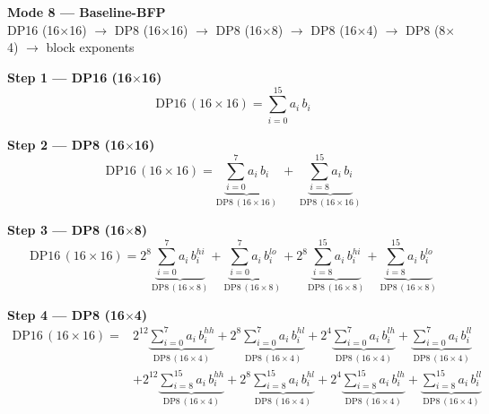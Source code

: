 \documentclass[fleqn]{article}
\newcommand{\DPop}[3]{\mathrm{DP#1}\,(#2\!\times\!#3)}
\begin{document}
\begin{center}
{\LARGE \textbf{Mode 8 --- Baseline-BFP}}\\[4pt]
{\large DP16 (16$\times$16) $\rightarrow$ DP8 (16$\times$16) $\rightarrow$ DP8 (16$\times$8) $\rightarrow$ DP8 (16$\times$4) $\rightarrow$ DP8 (8$\times$4) $\rightarrow$ block exponents}
\end{center}

\vspace{0.3em}

\textbf{Step 1 --- DP16 (16$\times$16)}
\[ \DPop{16}{16}{16} = \sum_{i=0}^{15} a_i \, b_i \]

\textbf{Step 2 --- DP8 (16$\times$16)}
\[
\DPop{16}{16}{16}
  = \underbrace{\sum_{i=0}^{7} a_i \, b_i}_{\DPop{8}{16}{16}}
  \; + \; \underbrace{\sum_{i=8}^{15} a_i \, b_i}_{\DPop{8}{16}{16}}
\]

\textbf{Step 3 --- DP8 (16$\times$8)}
\[
\DPop{16}{16}{16}
  = 2^{8} \underbrace{\sum_{i=0}^{7} a_i \, b_i^{hi}}_{\DPop{8}{16}{8}}
  + \underbrace{\sum_{i=0}^{7} a_i \, b_i^{lo}}_{\DPop{8}{16}{8}}
  + 2^{8} \underbrace{\sum_{i=8}^{15} a_i \, b_i^{hi}}_{\DPop{8}{16}{8}}
  + \underbrace{\sum_{i=8}^{15} a_i \, b_i^{lo}}_{\DPop{8}{16}{8}}
\]

\textbf{Step 4 --- DP8 (16$\times$4)}
\begin{align*}
\DPop{16}{16}{16} = {}
  & 2^{12} \underbrace{\sum_{i=0}^{7} a_i \, b_i^{hh}}_{\DPop{8}{16}{4}}
  + 2^{8} \underbrace{\sum_{i=0}^{7} a_i \, b_i^{hl}}_{\DPop{8}{16}{4}}
  + 2^{4} \underbrace{\sum_{i=0}^{7} a_i \, b_i^{lh}}_{\DPop{8}{16}{4}}
  + \underbrace{\sum_{i=0}^{7} a_i \, b_i^{ll}}_{\DPop{8}{16}{4}} \\[0.3em]
  & + 2^{12} \underbrace{\sum_{i=8}^{15} a_i \, b_i^{hh}}_{\DPop{8}{16}{4}}
  + 2^{8} \underbrace{\sum_{i=8}^{15} a_i \, b_i^{hl}}_{\DPop{8}{16}{4}}
  + 2^{4} \underbrace{\sum_{i=8}^{15} a_i \, b_i^{lh}}_{\DPop{8}{16}{4}}
  + \underbrace{\sum_{i=8}^{15} a_i \, b_i^{ll}}_{\DPop{8}{16}{4}}
\end{align*}
\end{document}
